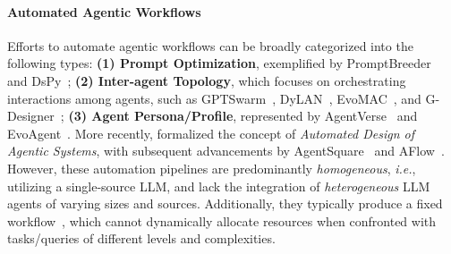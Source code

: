 \documentclass{article}
\theoremstyle{plain}
\theoremstyle{definition}
\theoremstyle{remark}
\begin{document}
\vspace{-0.7em}
\paragraph{Automated Agentic Workflows}

Efforts to automate agentic workflows can be broadly categorized into the following types: \textbf{(1) Prompt Optimization}, exemplified by PromptBreeder~\citep{fernando2023promptbreeder} and DsPy~\citep{khattab2023dspy}; \textbf{(2) Inter-agent Topology}, which focuses on orchestrating interactions among agents, such as GPTSwarm~\citep{zhuge2024gptswarm}, DyLAN~\citep{arXiv2023_Dynamic-LLM-Agent}, EvoMAC~\citep{hu2024evomac}, and G-Designer~\citep{zhang2024gdesigner}; \textbf{(3) Agent Persona/Profile}, represented by AgentVerse~\citep{chen2023agentverse} and EvoAgent~\citep{yuan2024evoagent}. More recently, \citet{hu2024adas} formalized the concept of \textit{Automated Design of Agentic Systems}, with subsequent advancements by AgentSquare~\citep{shang2024agentsquare} and AFlow~\citep{zhang2024aflow}. However, these automation pipelines are predominantly \textit{homogeneous}, \textit{i.e.}, utilizing a single-source LLM, and lack the integration of \textit{heterogeneous} LLM agents of varying sizes and sources. Additionally, they typically produce a fixed workflow~\citep{yuan2024evoagent,zhuge2024gptswarm,zhang2024aflow}, which cannot dynamically allocate resources when confronted with tasks/queries of different levels and complexities.
\end{document}
